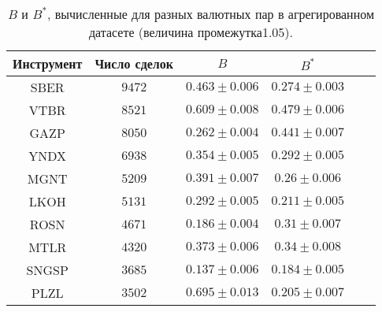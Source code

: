 \begin{table}[h!]
    \begin{center}
        \begin{tabular}{|c|c|c|c|c|c|}
            \hline
            Инструмент & Число сделок & $B$               & $B ^*$            \\ \hline
            SBER & $9472$ & $0.463 \pm 0.006$ & $0.274 \pm 0.003$ \\ \hline
            VTBR       & $8521$       & $0.609 \pm 0.008$ & $0.479 \pm 0.006$ \\ \hline
            GAZP       & $8050$       & $0.262 \pm 0.004$ & $0.441 \pm 0.007$ \\ \hline
            YNDX       & $6938$       & $0.354 \pm 0.005$ & $0.292 \pm 0.005$ \\ \hline
            MGNT       & $5209$       & $0.391 \pm 0.007$ & $0.26 \pm 0.006$  \\ \hline
            LKOH       & $5131$       & $0.292 \pm 0.005$ & $0.211 \pm 0.005$ \\ \hline
            ROSN       & $4671$       & $0.186 \pm 0.004$ & $0.31 \pm 0.007$  \\ \hline
            MTLR       & $4320$       & $0.373 \pm 0.006$ & $0.34 \pm 0.008$  \\ \hline
            SNGSP      & $3685$       & $0.137 \pm 0.006$ & $0.184 \pm 0.005$ \\ \hline
            PLZL       & $3502$       & $0.695 \pm 0.013$ & $0.205 \pm 0.007$ \\ \hline
        \end{tabular}
    \end{center}\caption{$B$ и $B ^*$, вычисленные для разных валютных пар в агрегированном датасете (величина промежутка1.05).}
    \label{Aggreg1CU1.05} \end{table}
